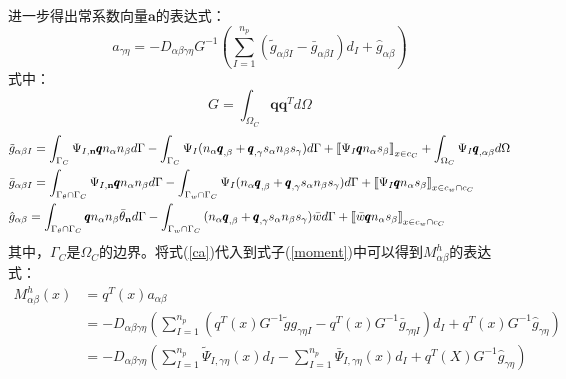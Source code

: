 \documentclass[a4paper]{article}
\begin{document}
进一步得出常系数向量$\pmb{a}$的表达式：
\begin{equation}\label{ca}
    a_{\gamma\eta}=-D_{\alpha\beta\gamma\eta}G^{-1}(\sum_{I=1}^{n_p}(\tilde{g}_{\alpha\beta I}-\bar{g}_{\alpha\beta I})d_I+\hat{g}_{\alpha\beta})
\end{equation}
式中：
\begin{equation}
    G=\int_{\Omega_C}\pmb{q}\pmb{q}^Td\Omega
\end{equation}
\begin{equation}
\begin{split}
    &{\tilde g}_{\alpha\beta I} = \int_{{\Gamma _C}}^{}{{\Psi _{I,{\bf{n}}}}{\pmb{q}}{n_\alpha }{n_\beta }d\Gamma }-\int_{{\Gamma _C}}^{}{{\Psi _I}({n_\alpha }{{\pmb{q}}_{,\beta }} + {{\pmb{q}}_{,\gamma }}{s_\alpha}{n_\beta }{s_\gamma})d\Gamma }  + {\left[\kern-0.15em\left[ {{\Psi _I}{\pmb{q}}{n_\alpha }{s_\beta }} 
     \right]\kern-0.15em\right]_{{{x}} \in {c_C}}} + \int_{{\Omega _C}}^{} {{\Psi _I}{{\pmb{q}}_{,\alpha \beta }}d\Omega } \\
    &{\bar g}_{\alpha \beta I} = \int_{{\Gamma _\theta } \cap {\Gamma _C}}^{} {{\Psi _{I,{\bf{n}}}}{\pmb{q}}{n_\alpha }{n_\beta }d\Gamma }  - \int_{{\Gamma _w} \cap {\Gamma _C}}^{} {{\Psi _I}({n_\alpha }{{\pmb{q}}_{,\beta }} + {{\pmb{q}}_{,\gamma }}{s_\alpha }{n_\beta }{s_\gamma })d\Gamma }  + {\left[\kern-0.15em\left[ {{\Psi _I}{\pmb{q}}{n_\alpha }{s_\beta }} 
     \right]\kern-0.15em\right]_{{{x}} \in {c_w} \cap {c_C}}}\\
    &\hat{g}_{\alpha \beta }= \int_{{\Gamma _\theta } \cap {\Gamma _C}}^{} {{\pmb{q}}{n_\alpha }{n_\beta }{{\bar \theta }_{\bf{n}}}d\Gamma }  - \int_{{\Gamma _w} \cap {\Gamma _C}}^{} {({n_\alpha }{{\pmb{q}}_{,\beta }} + {{\pmb{q}}_{,\gamma }}{s_\alpha }{n_\beta }{s_\gamma })\bar wd\Gamma }  + {\left[\kern-0.15em\left[ {\bar w{\pmb{q}}{n_\alpha }{s_\beta }} 
     \right]\kern-0.15em\right]_{{{x}} \in {c_w} \cap {c_C}}}
\end{split}
\end{equation}
其中，$\Gamma_C$是$\Omega_C$的边界。将式(\ref{ca})代入到式子(\ref{moment})中可以得到${M}^h_{\alpha\beta}$的表达式：
\begin{equation}
\begin{split}
M_{\alpha\beta}^h(x)&=q^T(x)a_{\alpha\beta}\\
&=-D_{\alpha\beta\gamma\eta}(\sum_{I=1}^{n_p}(q^T(x)G^{-1}\tilde{g}g_{\gamma\eta I}-q^T(x)G^{-1}\bar{g}_{\gamma\eta I})d_I+q^T(x)G^{-1}\hat{g}_{\gamma\eta})\\
&=-D_{\alpha\beta\gamma\eta}(\sum_{I=1}^{n_p}\tilde{\Psi}_{I,\gamma\eta}(x)d_I-\sum_{I=1}^{n_p}\bar{\Psi}_{I,\gamma\eta}(x)d_I+q^T(X)G^{-1}\hat{g}_{\gamma\eta})
\end{split}
\end{equation}
\end{document}
